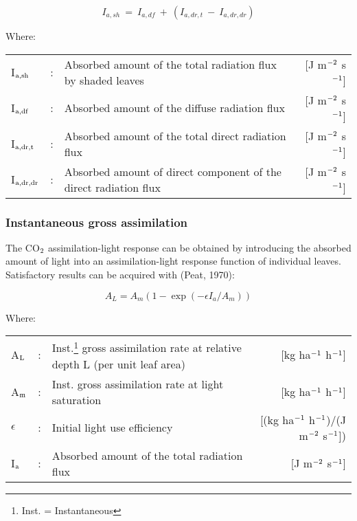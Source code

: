 \begin{equation}
\label{eq:5.22}
I _{a,sh} ~=~ I _{a,df} ~+~ (I_{a,dr,t} ~-~ I_{a,dr,dr} )
\end{equation}

Where:\\[5pt]
\begin{tabularx}{\textwidth}{llXr}
I$_{{\rm a,sh}}$ &:& Absorbed amount of the total radiation flux by shaded leaves
    &    [J m$^{{\rm -2}}$ s$^{{\rm -1}}$]\\
I$_{{\rm a,df}}$ &:& Absorbed amount of the diffuse radiation flux
   &     [J m$^{{\rm -2}}$ s$^{{\rm -1}}$]\\
I$_{{\rm a,dr,t}}$ &:& Absorbed amount of the total direct radiation flux
   &     [J m$^{{\rm -2}}$ s$^{{\rm -1}}$]\\
I$_{{\rm a,dr,dr}}$ &:& Absorbed amount of direct component of the  direct radiation flux
   & [J m$^{{\rm -2}}$ s$^{{\rm -1}}$]\\
\end{tabularx}


\subsubsection{Instantaneous gross assimilation}
The CO$_{{\rm 2}}$ assimilation-light response can be obtained by introducing the absorbed amount
of light into an assimilation-light response function of individual leaves. Satisfactory
results can be acquired with (Peat, 1970):

\begin{equation}
\label{eq:5.23}
A_{L} = A_{m} (1-\exp({{-\epsilon I_{a}}/{A_{m}}}))
\end{equation}

Where:\\[5pt]
\begin{tabularx}{\textwidth}{llXr}
A$_{{\rm L}}$ &:& Inst.\footnote{ Inst. = Instantaneous} gross assimilation 
     rate at relative depth L (per unit leaf area)    &    
     [kg ha$^{{\rm -1}}$ h$^{{\rm -1}}$]\\
A$_{{\rm m}}$ &:& Inst. gross assimilation rate at light saturation    & 
     [kg ha$^{{\rm -1}}$ h$^{{\rm -1}}$]\\
$\epsilon$ &:& Initial light use efficiency   &   [(kg ha$^{{\rm -1}}$ 
     h$^{{\rm -1}}$)/(J m$^{{\rm -2}}$ s$^{{\rm -1}}$])\\
I$_{{\rm a}}$ &:& Absorbed amount of the total radiation flux     &   
     [J m$^{{\rm -2}}$ s$^{{\rm -1}}$]\\
\end{tabularx}

